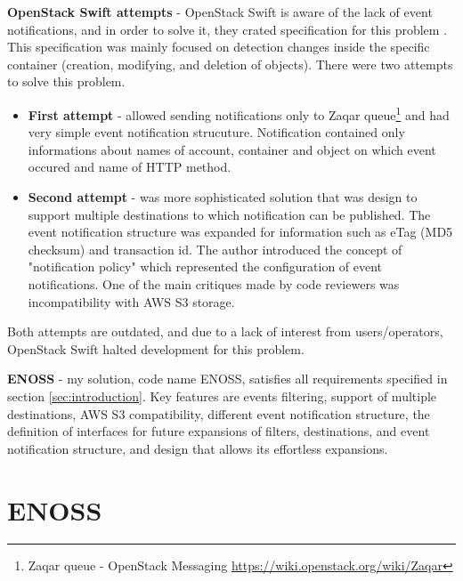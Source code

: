 \documentclass{ExcelAtFIT}
\begin{document}
\textbf{OpenStack Swift attempts} - OpenStack Swift is aware of the lack of event notifications, and in order to solve it, they crated specification for this problem \cite{swiftProblem}. This specification was mainly focused on detection changes inside the specific container (creation, modifying, and deletion of objects). There were two attempts to solve this problem.
\begin{itemize}
	\item \textbf{First attempt} \cite{swiftFirstAttempt} - allowed sending notifications only to Zaqar queue\footnote{Zaqar queue - OpenStack Messaging {\url{https://wiki.openstack.org/wiki/Zaqar}}} and had very simple event notification strucuture. Notification contained only informations about names of account, container and object on which event occured and name of HTTP method.
	\item \textbf{Second attempt} \cite{swiftSecondAttempt} - was more sophisticated solution that was design to support multiple destinations to which notification can be published. The event notification structure was expanded for information such as eTag (MD5 checksum) and transaction id. The author introduced the concept of "notification policy" which represented the configuration of event notifications. One of the main critiques made by code reviewers was incompatibility with AWS S3 storage.
\end{itemize}

Both attempts are outdated, and due to a lack of interest from users/operators, OpenStack Swift halted development for this problem.


\textbf{ENOSS} - my solution, code name ENOSS, satisfies all requirements specified in section \ref{sec:introduction}. Key features are events filtering, support of multiple destinations, AWS S3 compatibility, different event notification structure, the definition of interfaces for future expansions of filters, destinations, and event notification structure, and design that allows its effortless expansions.

\section{ENOSS}\label{sec:ENOSS}
\end{document}
